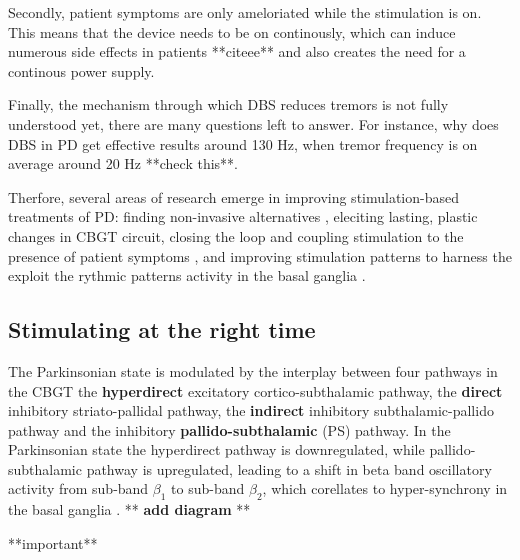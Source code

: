 Secondly, patient symptoms are only ameloriated while the stimulation is on. This means that
the device needs to be on continously, which can induce numerous side effects in patients
**citeee** and also creates the need for a continous power supply.

Finally, the mechanism through which DBS reduces tremors is not fully understood yet, there
are many questions left to answer. For instance, why does DBS in PD get effective results around
130 Hz, when tremor frequency is on average around 20 Hz **check this**.

Therfore, several areas of research emerge in improving stimulation-based treatments of PD:
finding non-invasive alternatives \cite{saturnino2017target, schwab2020spike}, eleciting lasting,
plastic changes in CBGT circuit, closing the loop and coupling stimulation to the presence of
patient symptoms \cite{beudel2018adaptive}, and improving stimulation patterns to harness the
exploit the rythmic patterns activity in the basal ganglia \cite{cagnan2017stimulating, west2022stimulating}.

\subsection{Stimulating at the right time}
The Parkinsonian state is modulated by the interplay between four pathways in the CBGT
the \textbf{hyperdirect} excitatory cortico-subthalamic pathway,
the \textbf{direct} inhibitory striato-pallidal pathway,
the \textbf{indirect} inhibitory subthalamic-pallido pathway and
the inhibitory \textbf{pallido-subthalamic} (PS) pathway. In the Parkinsonian state the hyperdirect
pathway is downregulated, while pallido-subthalamic pathway is upregulated, leading to a shift in
beta band oscillatory activity from sub-band $\beta_1$ to sub-band $\beta_2$, which corellates to
hyper-synchrony in the basal ganglia \cite{west2022stimulating}.
** \textbf{add diagram} **

**important** \cite{cagnan2017stimulating} \cite{beudel2018adaptive} \cite{west2022stimulating}

